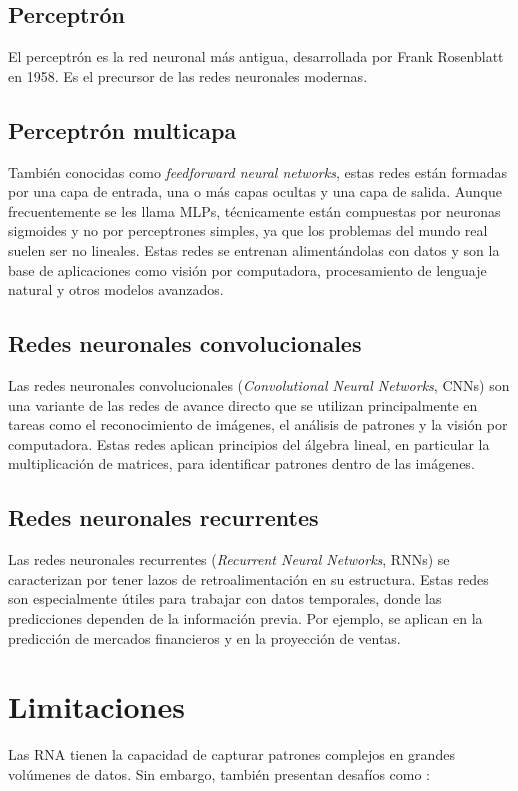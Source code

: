 \subsection{Perceptrón} 
El perceptrón es la red neuronal más antigua, desarrollada por Frank Rosenblatt en 1958. Es el precursor de las redes neuronales modernas.  

\subsection{Perceptrón multicapa} 
También conocidas como \textit{feedforward neural networks}, estas redes están formadas por una capa de entrada, una o más capas ocultas y una capa de salida. Aunque frecuentemente se les llama MLPs, técnicamente están compuestas por neuronas sigmoides y no por perceptrones simples, ya que los problemas del mundo real suelen ser no lineales. Estas redes se entrenan alimentándolas con datos y son la base de aplicaciones como visión por computadora, procesamiento de lenguaje natural y otros modelos avanzados.

\subsection{Redes neuronales convolucionales} 
Las redes neuronales convolucionales (\textit{Convolutional Neural Networks}, CNNs) son una variante de las redes de avance directo que se utilizan principalmente en tareas como el reconocimiento de imágenes, el análisis de patrones y la visión por computadora. Estas redes aplican principios del álgebra lineal, en particular la multiplicación de matrices, para identificar patrones dentro de las imágenes.

\subsection{Redes neuronales recurrentes} 
Las redes neuronales recurrentes (\textit{Recurrent Neural Networks}, RNNs) se caracterizan por tener lazos de retroalimentación en su estructura. Estas redes son especialmente útiles para trabajar con datos temporales, donde las predicciones dependen de la información previa. Por ejemplo, se aplican en la predicción de mercados financieros y en la proyección de ventas.


\section{Limitaciones}
Las RNA tienen la capacidad de capturar patrones complejos en grandes volúmenes de datos. Sin embargo, también presentan desafíos como \cite{L13}:

